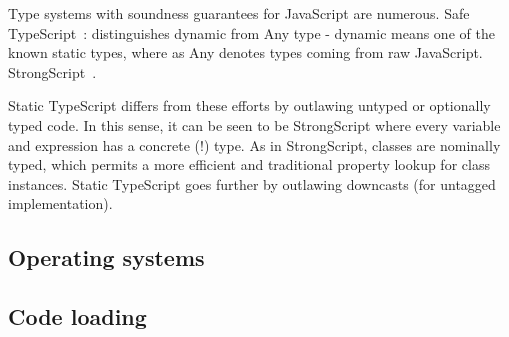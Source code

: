 Type systems with soundness guarantees for JavaScript are numerous. 
Safe TypeScript~\cite{SafeTypeScript15}: distinguishes dynamic from Any type - dynamic means
one of the known static types, where as Any denotes types coming
from raw JavaScript.
StrongScript~\cite{StrongScriptECOOP15}.

Static TypeScript differs from these efforts by outlawing untyped or optionally typed
code.  In this sense, it can be seen to be StrongScript where every variable and 
expression has a concrete (!) type.   As in StrongScript, classes are nominally typed,
which permits a more efficient and traditional property lookup for class instances. 
Static TypeScript goes further by outlawing downcasts (for untagged implementation).


\subsection{Operating systems}



\subsection{Code loading}


